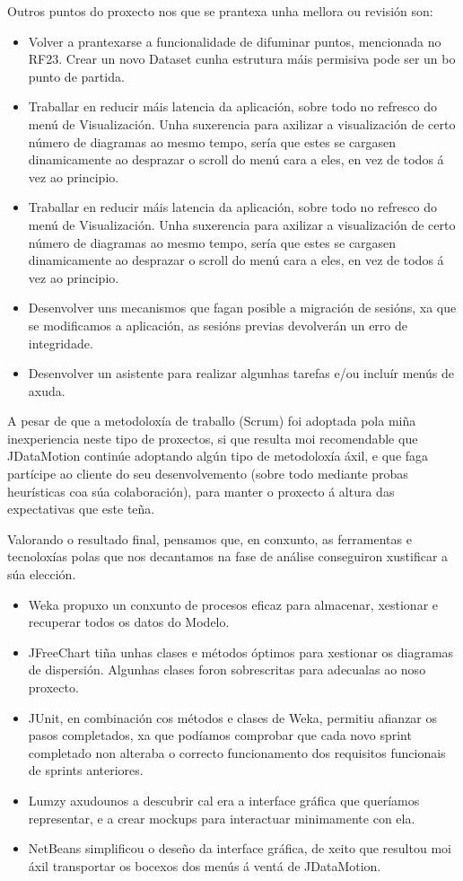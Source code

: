 Outros puntos do proxecto nos que se prantexa unha mellora ou revisión son: 

\begin{itemize}
\item Volver a prantexarse a funcionalidade de difuminar puntos, mencionada no RF23. Crear un novo Dataset cunha estrutura máis permisiva pode ser un bo punto de partida.
\item Traballar en reducir máis latencia da aplicación, sobre todo no refresco do menú de Visualización. Unha suxerencia para axilizar a visualización de certo número de diagramas ao mesmo tempo, sería que estes se cargasen dinamicamente ao desprazar o scroll do menú cara a eles, en vez de todos á vez ao principio.
\item Traballar en reducir máis latencia da aplicación, sobre todo no refresco do menú de Visualización. Unha suxerencia para axilizar a visualización de certo número de diagramas ao mesmo tempo, sería que estes se cargasen dinamicamente ao desprazar o scroll do menú cara a eles, en vez de todos á vez ao principio.
\item Desenvolver uns mecanismos que fagan posible a migración de sesións, xa que se modificamos a aplicación, as sesións previas devolverán un erro de integridade.
\item Desenvolver un asistente para realizar algunhas tarefas e/ou incluír menús de axuda.
\end{itemize}

A pesar de que a metodoloxía de traballo (Scrum) foi adoptada pola miña inexperiencia neste tipo de proxectos, si que resulta moi recomendable que JDataMotion continúe adoptando algún tipo de metodoloxía áxil, e que faga partícipe ao cliente do seu desenvolvemento (sobre todo mediante probas heurísticas coa súa colaboración), para manter o proxecto á altura das expectativas que este teña.

Valorando o resultado final, pensamos que, en conxunto, as ferramentas e tecnoloxías polas que nos decantamos na fase de análise conseguiron xustificar a súa elección.

\begin{itemize}
\item Weka propuxo un conxunto de procesos eficaz para almacenar, xestionar e recuperar todos os datos do Modelo.
\item JFreeChart tiña unhas clases e métodos óptimos para xestionar os diagramas de dispersión. Algunhas clases foron sobrescritas para adecualas ao noso proxecto.
\item JUnit,  en combinación cos métodos e clases de Weka, permitiu afianzar os pasos completados, xa que podíamos comprobar que cada novo sprint completado non alteraba o correcto funcionamento dos requisitos funcionais de sprints anteriores.
\item Lumzy axudounos a descubrir cal era a interface gráfica que queríamos representar, e a crear mockups para interactuar minimamente con ela.
\item NetBeans simplificou o deseño da interface gráfica, de xeito que resultou moi áxil transportar os bocexos dos menús á ventá de JDataMotion.
\end{itemize}
